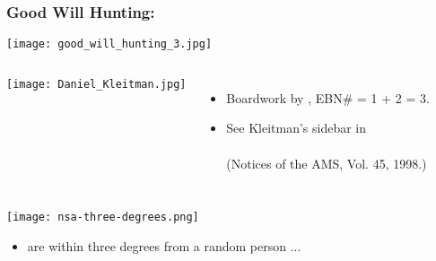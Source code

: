 \begin{frame}

  \frametitle{Good Will Hunting:}
  \texttt{[image: good\_will\_hunting\_3.jpg]}

  \begin{columns}
    \texttt{[image: Daniel\_Kleitman.jpg]}
    \begin{itemize}
    \item 
      Boardwork by
      , EBN\# = 1 + 2 = 3.
    \item
      See Kleitman's sidebar in \\
      \\
      (Notices of the AMS, Vol. 45, 1998.)
    \end{itemize}
  \end{columns}
  
\end{frame}


\begin{frame}

  \texttt{[image: nsa-three-degrees.png]}

  \begin{itemize}
  \item 
    are within three degrees from a random person ...
  \end{itemize}

\end{frame}



